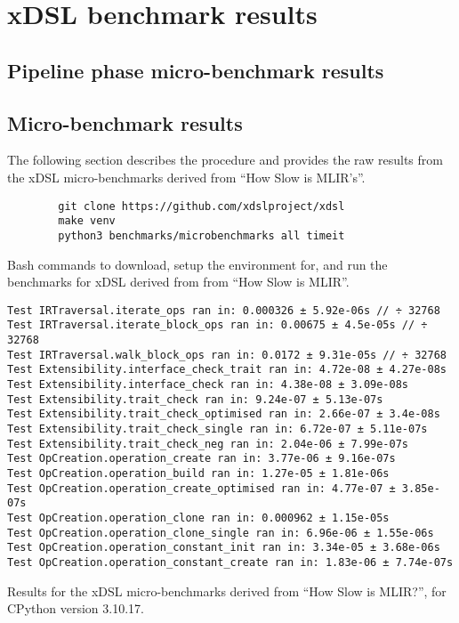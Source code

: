 \chapter{xDSL benchmark results}
\label{chap:xdsl-benchmark-results}

\section{Pipeline phase micro-benchmark results}

\section{Micro-benchmark results}

The following section describes the procedure and provides the raw results from the xDSL micro-benchmarks derived from ``How Slow is MLIR's''.

\vspace{2em}

\begin{code}
    \begin{verbatim}
        git clone https://github.com/xdslproject/xdsl
        make venv
        python3 benchmarks/microbenchmarks all timeit
    \end{verbatim}
    \caption{Bash commands to download, setup the environment for, and run the benchmarks for xDSL derived from from ``How Slow is MLIR''.}
    \label{listing:bash-xdsl-ubench-run}
\end{code}

\vspace{2em}

\begin{code}
    \begin{verbatim}
Test IRTraversal.iterate_ops ran in: 0.000326 ± 5.92e-06s // ÷ 32768
Test IRTraversal.iterate_block_ops ran in: 0.00675 ± 4.5e-05s // ÷ 32768
Test IRTraversal.walk_block_ops ran in: 0.0172 ± 9.31e-05s // ÷ 32768
Test Extensibility.interface_check_trait ran in: 4.72e-08 ± 4.27e-08s
Test Extensibility.interface_check ran in: 4.38e-08 ± 3.09e-08s
Test Extensibility.trait_check ran in: 9.24e-07 ± 5.13e-07s
Test Extensibility.trait_check_optimised ran in: 2.66e-07 ± 3.4e-08s
Test Extensibility.trait_check_single ran in: 6.72e-07 ± 5.11e-07s
Test Extensibility.trait_check_neg ran in: 2.04e-06 ± 7.99e-07s
Test OpCreation.operation_create ran in: 3.77e-06 ± 9.16e-07s
Test OpCreation.operation_build ran in: 1.27e-05 ± 1.81e-06s
Test OpCreation.operation_create_optimised ran in: 4.77e-07 ± 3.85e-07s
Test OpCreation.operation_clone ran in: 0.000962 ± 1.15e-05s
Test OpCreation.operation_clone_single ran in: 6.96e-06 ± 1.55e-06s
Test OpCreation.operation_constant_init ran in: 3.34e-05 ± 3.68e-06s
Test OpCreation.operation_constant_create ran in: 1.83e-06 ± 7.74e-07s
    \end{verbatim}
    \caption{Results for the xDSL micro-benchmarks derived from ``How Slow is MLIR?'', for CPython version 3.10.17.}
    \label{listing:how-slow-is-mlir-xdsl-microbenchmark-results}
\end{code}
